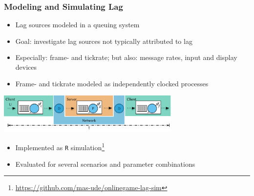\documentclass{UDEbeamerEN}
\begin{document}
\begin{frame}
	\frametitle{Modeling and Simulating Lag}

	\begin{itemize}
		\item Lag sources modeled in a queuing system
		\item Goal: investigate lag sources not typically attributed to lag
		\item Especially: frame- and tickrate; but also: message rates, input and display devices
		\item Frame- and tickrate modeled as independently clocked processes
	\end{itemize}

	\pause
	\begin{center}
		\includegraphics[height=2cm]{../../../models/e2e-lag-model.pdf}
	\end{center}

	\vspace{-4mm}
	\begin{itemize}
		\item Implemented as \texttt{R} simulation\footnote[frame]<2->{\url{https://github.com/mas-ude/onlinegame-lag-sim}}
		\item Evaluated for several scenarios and parameter combinations
	\end{itemize}

\end{frame}
\end{document}

